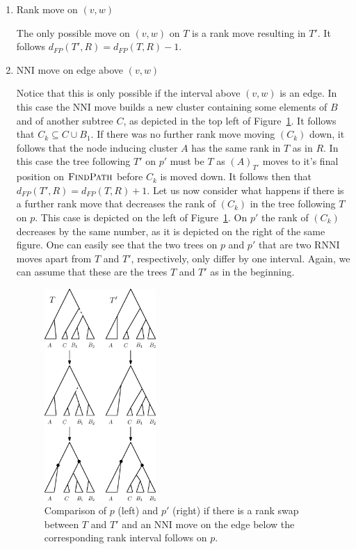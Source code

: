 \documentclass{amsart}
\newcommand{\rnni}{\mathrm{RNNI}}
\newcommand{\findpath}{\textsc{FindPath}}
\newcommand{\nni}{\mathrm{NNI}}
\begin{document}
\begin{enumerate}
    \item Rank move on $(v,w)$

    The only possible move on $(v,w)$ on $T$ is a rank move resulting in $T'$.
    It follows $d_{FP}(T',R) = d_{FP}(T,R) - 1$.

    \item $\nni$ move on edge above $(v,w)$

    Notice that this is only possible if the interval above $(v,w)$ is an edge.
    In this case the $\nni$ move builds a new cluster containing some elements of $B$ and of another subtree $C$, as depicted in the top left of Figure~\ref{fig:thm_fp_rank2}.
    It follows that $C_k \subseteq C \cup B_1$.
    If there was no further rank move moving $(C_k)$ down, it follows that the node inducing cluster $A$ has the same rank in $T$ as in $R$.
    In this case the tree following $T'$ on $p'$ must be $T$ as $(A)_{T'}$ moves to it's final position on $\findpath$ before $C_k$ is moved down.
    It follows then that $d_{FP}(T',R) = d_{FP}(T,R) + 1$.
    Let us now consider what happens if there is a further rank move that decreases the rank of $(C_k)$ in the tree following $T$ on $p$.
    This case is depicted on the left of Figure~\ref{fig:thm_fp_rank2}.
    On $p'$ the rank of $(C_k)$ decreases by the same number, as it is depicted on the right of the same figure.
    One can easily see that the two trees on $p$ and $p'$ that are two $\rnni$ moves apart from $T$ and $T'$, respectively, only differ by one interval.
    Again, we can assume that these are the trees $T$ and $T'$ as in the beginning.

    \begin{figure}[!hbt]
    \centering
    \includegraphics[width=0.4\textwidth]{thm_fp_rank2}
    \vspace{12pt}
    \caption{Comparison of $p$ (left) and $p'$ (right) if there is a rank swap between $T$ and $T'$ and an $\nni$ move on the edge below the corresponding rank interval follows on $p$.}
    \label{fig:thm_fp_rank2}
    \end{figure}


\end{enumerate}
\end{document}
